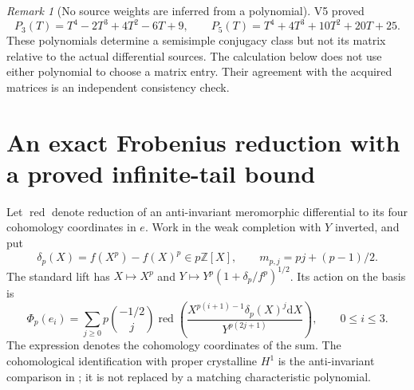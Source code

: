 \documentclass[11pt]{article}
\theoremstyle{definition}
\theoremstyle{remark}
\newtheorem{remark}[remark]{Remark}
\newcommand{\Z}{\mathbb Z}
\newcommand{\dd}{\mathrm d}
\begin{document}
\begin{remark}[No source weights are inferred from a polynomial]
V5 proved
\[
 P_3(T)=T^4-2T^3+4T^2-6T+9,\qquad
 P_5(T)=T^4+4T^3+10T^2+20T+25.
\]
These polynomials determine a semisimple conjugacy class but not its
matrix relative to the actual differential sources. The calculation
below does not use either polynomial to choose a matrix entry. Their
agreement with the acquired matrices is an independent consistency check.
\end{remark}

\section{An exact Frobenius reduction with a proved infinite-tail bound}
\label{sec:v11-acquisition}

Let $\operatorname{red}$ denote reduction of an anti-invariant meromorphic
differential to its four cohomology coordinates in $e$. Work in the weak
completion with $Y$ inverted, and put
\begin{equation}
 \delta_p(X)=f(X^p)-f(X)^p\in p\Z[X],\qquad
 m_{p,j}=pj+(p-1)/2.
 \label{eq:v11-defect}
\end{equation}
The standard lift has $X\mapsto X^p$ and
$Y\mapsto Y^p(1+\delta_p/f^p)^{1/2}$. Its action on the basis is
\begin{equation}
 \Phi_p(e_i)=
 \sum_{j\ge0}p\binom{-1/2}{j}
 \operatorname{red}\left(
  \frac{X^{p(i+1)-1}\delta_p(X)^j\dd X}
       {Y^{p(2j+1)}}\right),\qquad0\le i\le3.
 \label{eq:v11-series}
\end{equation}
The expression denotes the cohomology coordinates of the sum. The
cohomological identification with proper crystalline $H^1$ is the
anti-invariant comparison in \cite{KedlayaMW,BogaartBasis}; it is not
replaced by a matching characteristic polynomial.
\end{document}
